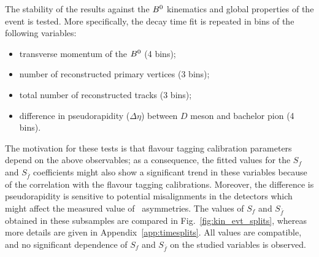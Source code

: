The stability of the results against the $B^0$ kinematics and global properties of the event is tested.
More specifically, the decay time fit is repeated in bins of the following variables:
\begin{itemize}[noitemsep,topsep=0pt]
  \item transverse momentum of the $B^0$ (4 bins);
  \item number of reconstructed primary vertices (3 bins);
  \item total number of reconstructed tracks (3 bins);
  \item difference in pseudorapidity ($\Delta\eta$) between $D$ meson and bachelor pion (4 bins).
\end{itemize}
The motivation for these tests is that flavour tagging calibration parameters depend on the above observables; as a consequence, the
fitted values for the $S_f$ and $S_{\bar f}$ coefficients might also show a significant trend in these variables because of
the correlation with the flavour tagging calibrations.
Moreover, the difference is pseudorapidity is sensitive to potential misalignments in the detectors which might affect the measured value of \CP~asymmetries.
The values of $S_{f}$ and  $S_{\bar{f}}$ obtained in these subsamples are compared in Fig.~\ref{fig:kin_evt_splits}, whereas more
details are given in Appendix~\ref{app:timesplits}.
All values are compatible, and no significant dependence of $S_f$ and $S_{\bar f}$ on the studied variables is observed.
